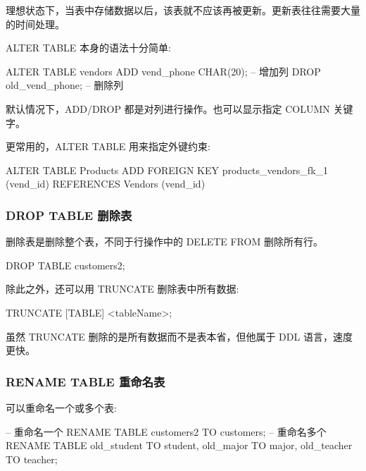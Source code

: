 理想状态下，当表中存储数据以后，该表就不应该再被更新。更新表往往需要大量的时间处理。

ALTER TABLE 本身的语法十分简单:

\begin{sql}
ALTER TABLE vendors
    ADD vend_phone CHAR(20);    -- 增加列
    DROP old_vend_phone;        -- 删除列
\end{sql}

默认情况下，ADD/DROP 都是对列进行操作。也可以显示指定 COLUMN 关键字。

更常用的，ALTER TABLE 用来指定外键约束:

\begin{sql}
ALTER TABLE Products
    ADD FOREIGN KEY products_vendors_fk_1 (vend_id) REFERENCES Vendors (vend_id)
\end{sql}


\subsubsection{DROP TABLE 删除表}

删除表是删除整个表，不同于行操作中的 DELETE FROM 删除所有行。

\begin{sql}
DROP TABLE customers2;
\end{sql}

除此之外，还可以用 TRUNCATE 删除表中所有数据:

\begin{sql}
TRUNCATE [TABLE] <tableName>;
\end{sql}

虽然 TRUNCATE 删除的是所有数据而不是表本省，但他属于 DDL 语言，速度更快。

\subsubsection{RENAME TABLE 重命名表}

可以重命名一个或多个表:

\begin{sql}
-- 重命名一个
RENAME TABLE customers2 TO customers;
-- 重命名多个
RENAME TABLE old_student TO student,
            old_major TO major,
            old_teacher TO teacher;
\end{sql}

